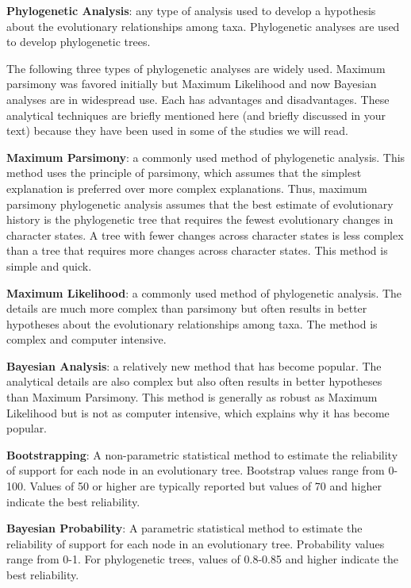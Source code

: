 \documentclass[letterpaper]{tufte-handout}
\begin{document}
\textbf{Phylogenetic Analysis}: any type of analysis used to develop a hypothesis about the evolutionary relationships among taxa.  Phylogenetic analyses are used to develop phylogenetic trees. 

The following three types of phylogenetic analyses are widely used. Maximum parsimony was favored initially but Maximum Likelihood and now Bayesian analyses are in widespread use. Each has advantages and disadvantages. These analytical techniques are briefly mentioned here (and briefly discussed in your text) because they have been used in some of the studies we will read.

\textbf{Maximum Parsimony}: a commonly used method of phylogenetic analysis.  This method uses the principle of parsimony, which assumes that the simplest explanation is preferred over more complex explanations.  Thus, maximum parsimony phylogenetic analysis assumes that the best estimate of evolutionary history is the phylogenetic tree that requires the fewest evolutionary changes in character states. A tree with fewer changes across character states is less complex than a tree that requires more changes across character states.  This method is simple and quick.

\textbf{Maximum Likelihood}: a commonly used method of phylogenetic analysis. The details are much more complex than parsimony but often results in better hypotheses about the evolutionary relationships among taxa. The method is complex and computer intensive. 

\textbf{Bayesian Analysis}: a relatively new method that has become popular. The analytical details are also complex but also often results in better hypotheses than Maximum Parsimony. This method is generally as robust as Maximum Likelihood but is not as computer intensive, which explains why it has become popular.

\textbf{Bootstrapping}: A non-parametric statistical method to estimate the reliability of support for each node in an evolutionary tree.  Bootstrap values range from 0-100. Values of 50 or higher are typically reported but values of 70 and higher indicate the best reliability. 

\textbf{Bayesian Probability}: A parametric statistical method to estimate the reliability of support for each node in an evolutionary tree.  Probability values range from 0-1. For phylogenetic trees, values of 0.8-0.85 and higher indicate the best reliability. 
\end{document}
